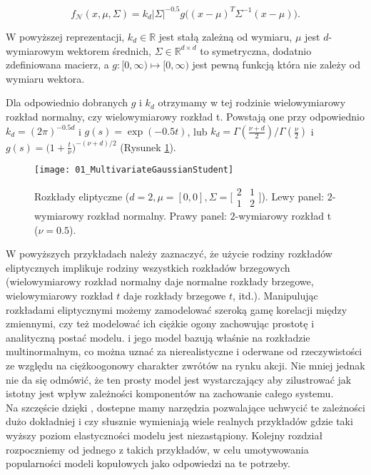 $$ f_{\mathcal{N}}(x, \mu, \Sigma) = k_d \vert\Sigma\vert^{-0.5}g\big((x-\mu)^T\Sigma^{-1}(x-\mu)\big).$$

W powyższej reprezentacji, $k_d \in\mathbb{R}$ jest stałą zależną od wymiaru, $\mu$ jest $d$-wymiarowym wektorem średnich, $\Sigma \in \mathbb{R}^{d \times d}$ to symetryczna, dodatnio zdefiniowana macierz, a $g \colon [0, \infty) \mapsto [0, \infty)$ jest pewną funkcją która nie zależy od wymiaru wektora.

Dla odpowiednio dobranych $g$ i $k_d$ otrzymamy w tej rodzinie wielowymiarowy rozkład normalny, czy wielowymiarowy rozkład t. Powstają one przy odpowiednio $k_d=(2\pi)^{-0.5d}$ i $g(s) = \exp(-0.5 t)$, lub $k_d=\Gamma(\frac{\nu + d}{2})/\Gamma(\frac{\nu}{2})$ i $g(s) = \big(1 + \frac{t}{\nu})^{-(\nu + d)/2}$ (Rysunek \ref{fig:multivariate_gaussian_student}).
\begin{figure}[H]
	\centering
	\texttt{[image: 01\_MultivariateGaussianStudent]}
	\caption{Rozkłady eliptyczne ($d=2, \mu=[0, 0], \Sigma = \big[\begin{smallmatrix}2&1\\1&2\end{smallmatrix}\big]$). Lewy panel: $2$-wymiarowy rozkład normalny. Prawy panel: $2$-wymiarowy rozkład t ($\nu = 0.5$).\label{fig:multivariate_gaussian_student}}
\end{figure}

W powyższych przykładach należy zaznaczyć, że użycie rodziny rozkładów eliptycznych implikuje rodziny wszystkich rozkładów brzegowych (wielowymiarowy rozkład normalny daje normalne rozkłady brzegowe, wielowymiarowy rozkład $t$ daje rozkłady brzegowe $t$, itd.). Manipulując rozkładami eliptycznymi możemy zamodelować szeroką gamę korelacji między zmiennymi, czy też modelować ich ciężkie ogony zachowując prostotę i analityczną postać modelu. \cite{Markovitz_MPT} i jego model bazują właśnie na rozkładzie multinormalnym, co można uznać za nierealistyczne i oderwane od rzeczywistości ze względu na ciężkoogonowy charakter zwrótów na rynku akcji. Nie mniej jednak nie da się odmówić, że ten prosty model jest wystarczający aby zilustrować jak istotny jest wpływ zależności komponentów na zachowanie całego systemu. \\
Na szczęście dzięki \cite{Sklar_Theorem}, dostepne mamy narzędzia pozwalające uchwycić te zależności dużo dokładniej i \cite{Cherubini_Copula_Methods_in_Finance} czy \cite{Kurowicka_Dependence_Modeling} słusznie wymieniają wiele realnych przykładów gdzie taki wyższy poziom elastyczności modelu jest niezastąpiony. Kolejny rozdział rozpoczniemy od jednego z takich przykładów, w celu umotywowania popularności modeli kopułowych jako odpowiedzi na te potrzeby.